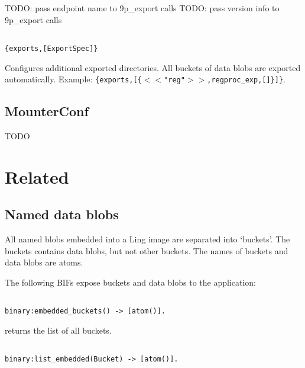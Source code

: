 TODO: pass endpoint name to 9p\_export calls
TODO: pass version info to 9p\_export calls

\begin{adjustwidth}{2.5em}{2.5em}
\begin{verbatim}

{exports,[ExportSpec]}

\end{verbatim}
\end{adjustwidth}

Configures additional exported directories. All buckets of data blobs are
exported automatically. Example: \texttt{\{exports,[\{$<$$<$"reg"$>$$>$,regproc\_exp,[]\}]\}}.

\section{MounterConf}
\label{mounterconf}

TODO

\chapter{Related}
\label{related}

\section{Named data blobs}
\label{nameddatablobs}

All named blobs embedded into a Ling image are separated into `buckets'. The
buckets contains data blobs, but not other buckets. The names of buckets and
data blobs are atoms.

The following BIFs expose buckets and data blobs to the application:

\begin{adjustwidth}{2.5em}{2.5em}
\begin{verbatim}

binary:embedded_buckets() -> [atom()].

\end{verbatim}
\end{adjustwidth}

returns the list of all buckets.

\begin{adjustwidth}{2.5em}{2.5em}
\begin{verbatim}

binary:list_embedded(Bucket) -> [atom()].

\end{verbatim}
\end{adjustwidth}

